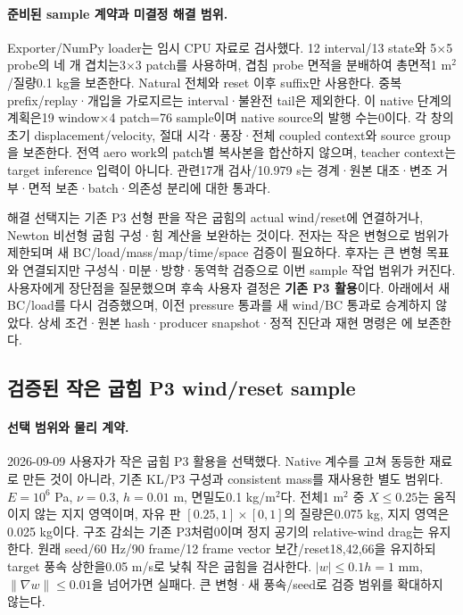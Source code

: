 \documentclass[10pt]{article}
\begin{document}
\paragraph{준비된 sample 계약과 미결정 해결 범위.}
Exporter/NumPy loader는 임시 CPU 자료로 검사했다. 12 interval/13 state와
5$\times$5 probe의 네 개 겹치는3$\times$3 patch를 사용하며, 겹침 probe 면적을 분배하여
총면적1 m$^2$/질량0.1 kg을 보존한다. Natural 전체와 reset 이후 suffix만 사용한다.
중복 prefix/replay·개입을 가로지르는 interval·불완전 tail은 제외한다.
이 native 단계의 계획은19 window$\times$4 patch=76 sample이며 native source의 발행 수는0이다.
각 창의 초기 displacement/velocity, 절대 시각·풍장·전체 coupled context와 source group을 보존한다.
전역 aero work의 patch별 복사본을 합산하지 않으며, teacher context는 target inference 입력이 아니다.
관련17개 검사/10.979 s는 경계·원본 대조·변조 거부·면적 보존·batch·의존성 분리에 대한 통과다.

해결 선택지는 기존 P3 선형 판을 작은 굽힘의 actual wind/reset에 연결하거나,
Newton 비선형 굽힘 구성·힘 계산을 보완하는 것이다. 전자는 작은 변형으로 범위가 제한되며
새 BC/load/mass/map/time/space 검증이 필요하다. 후자는 큰 변형 목표와 연결되지만
구성식·미분·방향·동역학 검증으로 이번 sample 작업 범위가 커진다. 사용자에게 장단점을 질문했으며
후속 사용자 결정은 \textbf{기존 P3 활용}이다. 아래에서 새 BC/load를 다시 검증했으며,
이전 pressure 통과를 새 wind/BC 통과로 승계하지 않았다.
상세 조건·원본 hash·producer snapshot·정적 진단과 재현 명령은
에 보존한다.

\subsection{검증된 작은 굽힘 P3 wind/reset sample}
\label{sec:r1-p3-wind-samples}

\paragraph{선택 범위와 물리 계약.}
2026-09-09 사용자가 작은 굽힘 P3 활용을 선택했다. Native 계수를 고쳐 동등한 재료로 만든 것이 아니라,
기존 KL/P3 구성과 consistent mass를 재사용한 별도 범위다.
\(E=10^6\) Pa, \(\nu=0.3\), \(h=0.01\) m, 면밀도0.1 kg/m$^2$다.
전체1 m$^2$ 중 \(X\leq0.25\)는 움직이지 않는 지지 영역이며,
자유 판 \([0.25,1]\times[0,1]\)의 질량은0.075 kg, 지지 영역은0.025 kg이다.
구조 감쇠는 기존 P3처럼0이며 정지 공기의 relative-wind drag는 유지한다.
원래 seed/60 Hz/90 frame/12 frame vector 보간/reset18,42,66을 유지하되
target 풍속 상한을0.05 m/s로 낮춰 작은 굽힘을 검사한다. \(|w|\leq0.1h=1\) mm,
\(\|\nabla w\|\leq0.01\)을 넘어가면 실패다. 큰 변형·새 풍속/seed로 검증 범위를 확대하지 않는다.
\end{document}
